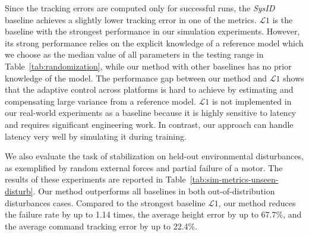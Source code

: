 %
Since the tracking errors are computed only for successful runs, the \emph{SysID} baseline achieves a slightly lower tracking error in one of the metrics.
%
$\mathcal{L}1$ is the baseline with the strongest performance in our simulation experiments. However, its strong performance relies on the explicit knowledge of a reference model which we choose as the median value of all parameters in the testing range in Table~\ref{tab:randomization}, while our method with other baselines has no prior knowledge of the model. 
%
The performance gap between our method and $\mathcal{L}1$ shows that the adaptive control across platforms is hard to achieve by estimating and compensating large variance from a reference model. 
%
$\mathcal{L}1$ is not implemented in our real-world experiments as a baseline because it is highly sensitive to latency and requires significant engineering work. In contrast, our approach can handle latency very well by simulating it during training.
%

We also evaluate the task of stabilization on held-out environmental disturbances, as exemplified by random external forces and partial failure of a motor. The results of these experiments are reported in Table~\ref{tab:sim-metrics-unseen-disturb}. Our method outperforms all baselines in both out-of-distribution disturbances cases. Compared to the strongest baseline $\mathcal{L}1$, our method reduces the failure rate by up to 1.14 times, the average height error by up to 67.7\%,  and the average command tracking error by up to 22.4\%. 


